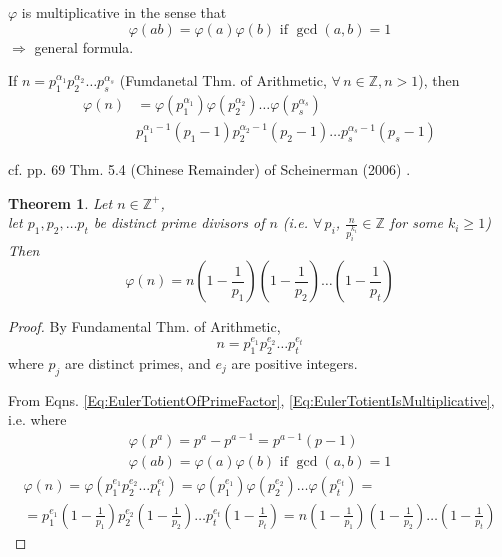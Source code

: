 \documentclass[10pt]{amsart}
\newtheorem{theorem}{Theorem}
\begin{document}
\begin{multicols*}{2}
$\varphi$ is multiplicative in the sense that 
\begin{equation}\label{Eq:EulerTotientIsMultiplicative}
\varphi(ab) = \varphi(a) \varphi(b)  \text{ if } \gcd(a,b) = 1
\end{equation}
$\Longrightarrow $ general formula.  

If $n=p_1^{\alpha_1}p_2^{\alpha_2} \dots p_s^{\alpha_s}$ (Fumdanetal Thm. of Arithmetic, $\forall \, n \in \mathbb{Z}, n>1$), then 
\begin{equation}
\boxed{ 
	\begin{aligned}
	\varphi(n) & = \varphi(p_1^{\alpha_1})  \varphi(p_2^{\alpha_2}) \dots \varphi(p_s^{\alpha_s}) \\ 
	& p_1^{\alpha_1 - 1 } (p_1 - 1) p_2^{\alpha_2 - 1} (p_2 - 1 ) \dots p_s^{\alpha_s -1} (p_s - 1) 
	\end{aligned} }
\end{equation}


cf. pp. 69 Thm. 5.4 (Chinese Remainder) of Scheinerman (2006) \cite{Sche2006}.  
\begin{theorem}
	Let $n\in \mathbb{Z}^+$, \\
	let $p_1,p_2, \dots p_t$ be distinct prime divisors of $n$ (i.e. $\forall \, p_i$, $\frac{n}{p_i^{k_i}} \in \mathbb{Z}$ for some $k_i \geq 1$) \\
	Then
	\begin{equation}
	\varphi(n) = n\left( 1 - \frac{1}{p_1} \right)\left( 1- \frac{1}{p_2} \right) \ldots \left( 1 - \frac{1}{p_t} \right) 	
	\end{equation}
\end{theorem}

\begin{proof}
	By Fundamental Thm. of Arithmetic, 
	\[
	n = p_1^{e_1} p_2^{e_2} \dots p_t^{e_t} 
	\]
	where $p_j$ are distinct primes, and $e_j$ are positive integers.  
	
	From Eqns. \ref{Eq:EulerTotientOfPrimeFactor}, \ref{Eq:EulerTotientIsMultiplicative}, i.e. where 
	\[
	\begin{gathered}
	\varphi(p^a) = p^a - p^{a-1} = p^{a-1} (p-1) \\
	\varphi(ab) = \varphi(a) \varphi(b)  \text{ if } \gcd(a,b) = 1
		\end{gathered}
		\]
		\[
		\begin{gathered}
	\varphi(n) = \varphi(p_1^{e_1}p_2^{e_2} \dots p_t^{e_t}) = \varphi(p_1^{e_1}) \varphi(p_2^{e_2}) \dots \varphi(p_t^{e_t}) = \\
	= p_1^{e_1} (1- \frac{1}{p_1} )p_2^{e_2} (1- \frac{1}{p_2} ) \dots p_t^{e_t} (1- \frac{1}{p_t} ) = n(1- \frac{1}{p_1}) (1- \frac{1}{p_2}) \dots (1- \frac{1}{p_t})
		\end{gathered}
		\]
	\end{proof}



\end{multicols*}
\end{document}

